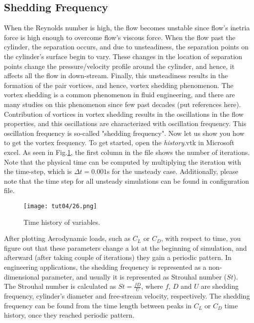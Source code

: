 \subsection{Shedding Frequency}
When the Reynolds number is high, the flow becomes unstable since flow's inetria force is high enough to overcome flow's viscous force. When the flow past the cylinder, the separation occurs, and due to unsteadiness, the separation points on the cylinder's surface begin to vary. These changes in the location of separation points change the pressure/velocity profile around the cylinder, and hence, it affects all the flow in down-stream. Finally, this unsteadiness results in the formation of the pair vortices, and hence, vortex shedding phenomenon. The vortex shedding is a common phenomenon in fluid engineering, and there are many studies on this phenomenon since few past decades (put references here). Contribution of vortices in vortex shedding results in the oscillations in the flow properties, and this oscillations are characterized with oscillation frequency. This oscillation frequency is so-called "shedding frequency". Now let us show you how to get the vortex frequency. To get started, open the \textit{history}.vtk in Microsoft excel. As seen in Fig.\ref{fig4:time_history}, the first column in the file shows the number of iterations. Note that the physical time can be computed by multiplying the iteration with the time-step, which is $\Delta t = 0.001$s for the unsteady case. Additionally, please note that the time step for all unsteady simulations can be found in configuration file.
\begin{figure}[htbp]
    \centering
    \texttt{[image: tut04/26.png]}
    \caption{Time history of variables.}
    \label{fig4:time_history}
\end{figure}
After plotting Aerodynamic loads, such as $C_L$ or $C_D$, with respect to time, you figure out that these parameters change a lot at the beginning of simulation, and afterward (after taking couple of iterations) they gain a periodic pattern. In engineering applications, the shedding frequency is represented as a non-dimensional parameter, and usually it is represented as Strouhal number ($St$). The Strouhal number is calculated as $St=\frac{f D}{U}$, where $f$, $D$ and $U$ are shedding frequency, cylinder's diameter and free-stream velocity, respectively. The shedding frequency can be found from the time length between peaks in $C_L$ or $C_D$ time history, once they reached periodic pattern.
